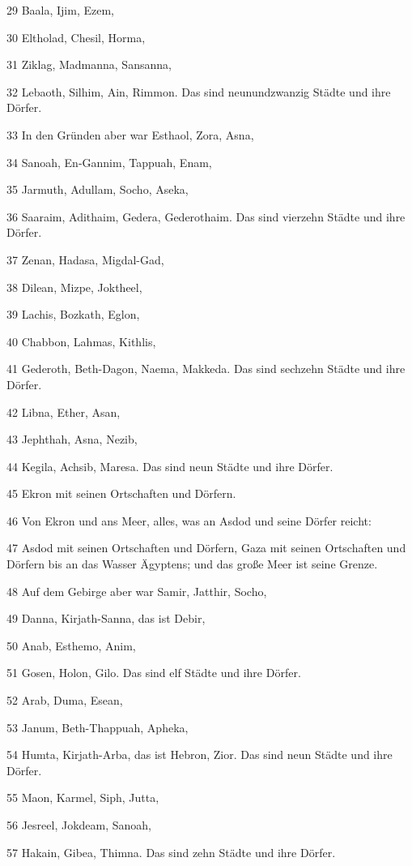 \par 29 Baala, Ijim, Ezem,
\par 30 Eltholad, Chesil, Horma,
\par 31 Ziklag, Madmanna, Sansanna,
\par 32 Lebaoth, Silhim, Ain, Rimmon. Das sind neunundzwanzig Städte und ihre Dörfer.
\par 33 In den Gründen aber war Esthaol, Zora, Asna,
\par 34 Sanoah, En-Gannim, Tappuah, Enam,
\par 35 Jarmuth, Adullam, Socho, Aseka,
\par 36 Saaraim, Adithaim, Gedera, Gederothaim. Das sind vierzehn Städte und ihre Dörfer.
\par 37 Zenan, Hadasa, Migdal-Gad,
\par 38 Dilean, Mizpe, Joktheel,
\par 39 Lachis, Bozkath, Eglon,
\par 40 Chabbon, Lahmas, Kithlis,
\par 41 Gederoth, Beth-Dagon, Naema, Makkeda. Das sind sechzehn Städte und ihre Dörfer.
\par 42 Libna, Ether, Asan,
\par 43 Jephthah, Asna, Nezib,
\par 44 Kegila, Achsib, Maresa. Das sind neun Städte und ihre Dörfer.
\par 45 Ekron mit seinen Ortschaften und Dörfern.
\par 46 Von Ekron und ans Meer, alles, was an Asdod und seine Dörfer reicht:
\par 47 Asdod mit seinen Ortschaften und Dörfern, Gaza mit seinen Ortschaften und Dörfern bis an das Wasser Ägyptens; und das große Meer ist seine Grenze.
\par 48 Auf dem Gebirge aber war Samir, Jatthir, Socho,
\par 49 Danna, Kirjath-Sanna, das ist Debir,
\par 50 Anab, Esthemo, Anim,
\par 51 Gosen, Holon, Gilo. Das sind elf Städte und ihre Dörfer.
\par 52 Arab, Duma, Esean,
\par 53 Janum, Beth-Thappuah, Apheka,
\par 54 Humta, Kirjath-Arba, das ist Hebron, Zior. Das sind neun Städte und ihre Dörfer.
\par 55 Maon, Karmel, Siph, Jutta,
\par 56 Jesreel, Jokdeam, Sanoah,
\par 57 Hakain, Gibea, Thimna. Das sind zehn Städte und ihre Dörfer.
